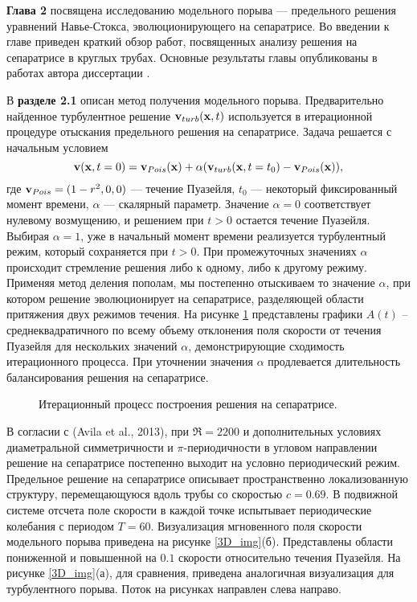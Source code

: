 \textbf{Глава 2} посвящена исследованию модельного порыва --- предельного решения уравнений Навье-Стокса, эволюционирующего на сепаратрисе. Во введении к главе приведен краткий обзор работ, посвященных анализу решения на сепаратрисе в круглых трубах. Основные результаты главы опубликованы в работах автора диссертации \cite{MZG2015, Kazan2015, KMU2015}.

В \textbf{разделе 2.1} описан метод получения модельного порыва. Предварительно найденное турбулентное решение $\mathbf{v}_{turb}(\mathbf{x},t)$ используется в итерационной процедуре отыскания предельного решения на сепаратрисе. Задача решается с начальным условием
\begin{equation} \label{edge_init_eq}
\mathbf{v}(\mathbf{x},t=0) = \mathbf{v}_{Pois}(\mathbf{x})+\alpha(\mathbf{v}_{turb}(\mathbf{x},t=t_0) - \mathbf{v}_{Pois}(\mathbf{x})),
\end{equation}
где $\mathbf{v}_{Pois}=(1-r^2,0,0)$ --- течение Пуазейля, $t_0$ --- некоторый фиксированный момент времени, $\alpha$ --- скалярный параметр. Значение $\alpha=0$ соответствует нулевому возмущению, и решением при $t > 0$ остается течение Пуазейля. Выбирая $\alpha=1$, уже в начальный момент времени реализуется турбулентный режим, который сохраняется при $t > 0$. При промежуточных значениях $\alpha$ происходит стремление решения либо к одному, либо к другому режиму. Применяя метод деления пополам, мы постепенно отыскиваем то значение $\alpha$, при котором решение эволюционирует на сепаратрисе, разделяющей области притяжения двух режимов течения. На рисунке \ref{bisection_pic} представлены графики $A(t)$ – среднеквадратичного по всему объему отклонения поля скорости от течения Пуазейля для нескольких значений $\alpha$, демонстрирующие сходимость итерационного процесса. При уточнении значения $\alpha$ продлевается длительность балансирования решения на сепаратрисе.

\begin{figure}
\caption{Итерационный процесс построения решения на сепаратрисе.}
\label{bisection_pic}
\end{figure}

В согласии с (Avila et al., 2013), при $\Re=2200$ и дополнительных условиях диаметральной симметричности и $\pi$-периодичности в угловом направлении решение на сепаратрисе постепенно выходит на условно периодический режим. Предельное решение на сепаратрисе описывает пространственно локализованную структуру, перемещающуюся вдоль трубы со скоростью $c=0.69$. В подвижной системе отсчета поле скорости в каждой точке испытывает периодические колебания с периодом $T=60$. Визуализация мгновенного поля скорости модельного порыва приведена на рисунке \ref{3D_img}(б). Представлены области пониженной и повышенной на $0.1$ скорости относительно течения Пуазейля. На рисунке \ref{3D_img}(а), для сравнения, приведена аналогичная визуализация для турбулентного порыва. Поток на рисунках направлен слева направо. 

